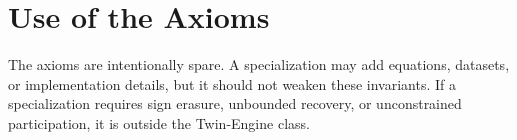 \documentclass[11pt]{article}
\begin{document}
\section{Use of the Axioms}
The axioms are intentionally spare. A specialization may add equations, datasets, or implementation details, but it should not weaken these invariants. If a specialization requires sign erasure, unbounded recovery, or unconstrained participation, it is outside the Twin-Engine class.
\end{document}
